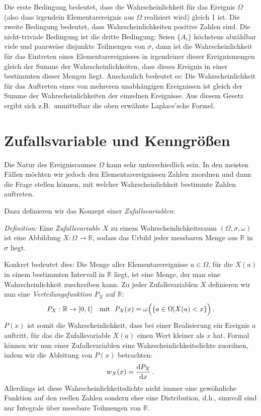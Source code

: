 Die erste Bedingung bedeutet, dass die Wahrscheinlichkeit
f\"ur das Ereignis $\Omega$ (also dass irgendein 
Elementarereignis aus $\Omega$ realisiert wird)
gleich 1 ist. Die zweite Bedingung bedeutet,
dass Wahrscheinlichkeiten positive Zahlen sind.
Die nicht-triviale Bedingung ist die dritte Bedingung: 
Seien $\{A_i\}$ h\"ochstens abz\"ahlbar viele und
paarweise disjunkte Teilmengen von $\sigma$, dann
ist die Wahrscheinlichkeit f\"ur das Eintreten eines 
Elementarereignisses
in irgendeiner dieser Ereignismengen gleich der Summe der
Wahrscheinlichkeiten, dass dieses Ereignis in einer
bestimmten dieser Mengen liegt. Anschaulich bedeutet
es: Die Wahrscheinlichkeit f\"ur das Auftreten eines 
von mehreren unabh\"angigen Ereignissen
ist gleich der Summe der Wahrscheinlichkeiten 
der einzelnen Ereignisse. Aus diesem Gesetz ergibt
sich z.B.\ unmittelbar die oben erw\"ahnte Laplace'sche Formel.


\section{Zufallsvariable und Kenngr\"o\ss en}

Die Natur des Ereignisraumes $\Omega$ kann sehr
unterschiedlich sein.
In den meisten F\"allen m\"ochten wir jedoch den 
Elementarereignissen Zahlen zuordnen und dann die Frage
stellen k\"onnen, mit welcher Wahrscheinlichkeit
bestimmte Zahlen auftreten.

Dazu definieren wir das Konzept einer
{\em Zufallsvariablen}:
\vspace{0.2cm}
 
 \noindent
 {\em Definition:} Eine {\em Zufallsvariable} $X$ zu einem
 Wahrscheinlichkeitsraum $(\Omega, \sigma, \omega)$ ist eine
 Abbildung $X: \Omega \longrightarrow \mathbb{R}$,
 sodass das Urbild jeder messbaren Menge aus $\mathbb{R}$
 in $\sigma$ liegt. 
 \vspace{0.2cm}
 
 Konkret bedeutet dies: Die Menge aller
 Elementarereignisse $a\in \Omega$, f\"ur die $X(a)$
 in einem bestimmten Intervall in $\mathbb{R}$ liegt,
 ist eine Menge, der man eine Wahrscheinlichkeit
 zuschreiben kann. Zu jeder Zufallsvariablen $X$ 
 definieren wir nun eine {\em Verteilungsfunktion} $P_X$
 auf $\mathbb{R}$:
\begin{equation}
    P_X: \mathbb{R} \rightarrow [0,1] ~~~ {\rm mit} ~~ 
     P_X(x) = \omega \Big( \{a \in \Omega| X(a) < x \} \Big) \, .
\end{equation}
$P(x)$ ist somit die Wahrscheinlichkeit, dass bei
einer Realisierung ein Ereignis $a$ auftritt, f\"ur
das die Zufallsvariable $X(a)$ einen Wert 
kleiner als $x$ hat. Formal k\"onnen wir nun einer
Zufallsvariablen eine Wahrscheinlichkeitsdichte
zuordnen, indem wir die Ableitung von $P(x)$
betrachten:
\begin{equation}
    w_X(x) = \frac{{\rm d}P_X}{{\rm d}x}  \, .
\end{equation}
Allerdings ist diese Wahrscheinlichkeitsdichte nicht
immer eine gew\"ohnliche Funktion auf den reellen
Zahlen sondern eher eine Distribution, d.h., 
sinnvoll sind nur Integrale \"uber messbare Teilmengen
von $\mathbb{R}$. 

